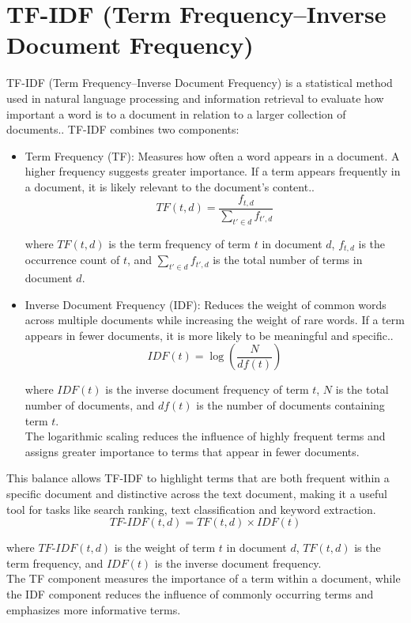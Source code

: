 \section{TF-IDF (Term Frequency–Inverse Document Frequency)}
TF-IDF (Term Frequency–Inverse Document Frequency) is a statistical method used in natural language processing and information retrieval to evaluate how important a word is to a document in relation to a larger collection of documents.\cite{tfidf}. TF-IDF combines two components:
\begin{itemize}
\item Term Frequency (TF): Measures how often a word appears in a document. A higher frequency suggests greater importance. If a term appears frequently in a document, it is likely relevant to the document’s content.\cite{tfidf}.
\begin{equation}
TF(t,d)=\frac{f_{t,d}}{\sum_{t' \in d} f_{t',d}}
\end{equation}

where \(TF(t,d)\) is the term frequency of term \(t\) in document \(d\), \(f_{t,d}\) is the occurrence count of \(t\), and \(\sum_{t' \in d} f_{t',d}\) is the total number of terms in document \(d\).
\item Inverse Document Frequency (IDF): Reduces the weight of common words across multiple documents while increasing the weight of rare words. If a term appears in fewer documents, it is more likely to be meaningful and specific.\cite{tfidf}.
\begin{equation}
IDF(t)=\log\left(\frac{N}{df(t)}\right)
\end{equation}

where \(IDF(t)\) is the inverse document frequency of term \(t\), \(N\) is the total number of documents, and \(df(t)\) is the number of documents containing term \(t\).
\\
The logarithmic scaling reduces the influence of highly frequent terms and assigns greater importance to terms that appear in fewer documents.

\end{itemize}
This balance allows TF-IDF to highlight terms that are both frequent within a specific document and distinctive across the text document, making it a useful tool for tasks like search ranking, text classification and keyword extraction.
\begin{equation}
TF\text{-}IDF(t,d)=TF(t,d)\times IDF(t)
\end{equation}

where \(TF\text{-}IDF(t,d)\) is the weight of term \(t\) in document \(d\), \(TF(t,d)\) is the term frequency, and \(IDF(t)\) is the inverse document frequency.\\ The TF component measures the importance of a term within a document, while the IDF component reduces the influence of commonly occurring terms and emphasizes more informative terms.

